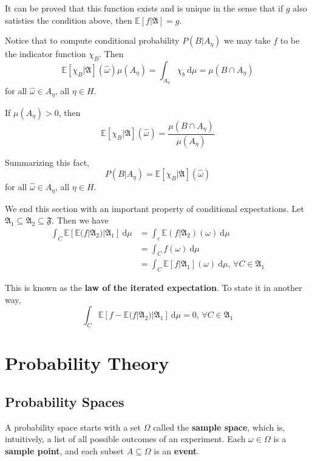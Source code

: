 \documentclass[12pt,a4paper]{article}
\theoremstyle{definition}
\begin{document}
It can be proved that this function exists and is unique in the sense that if $g$ also satisties the condition above, then $\mathbb{E}[f | \mathfrak{A}] = g$.

Notice that to compute conditional probability $P(B | A_\eta)$ we may take $f$ to be the indicator function $\chi_B$. Then
\[
	\mathbb{E}[\chi_B | \mathfrak{A}](\hat{\omega}) \mu(A_\eta) = \int_{A_\eta} \chi_b ~\mathrm{d}\mu = \mu(B \cap A_\eta)
\]
for all $\hat{\omega} \in A_\eta$, all $\eta \in H$.

If $\mu(A_\eta) > 0$, then
\[
	\mathbb{E}[\chi_B | \mathfrak{A}](\hat{\omega}) = \frac{\mu(B \cap A_\eta)}{\mu(A_\eta)}
\]

Summarizing this fact,
\[
	P(B | A_\eta) = \mathbb{E}[\chi_B | \mathfrak{A}](\hat{\omega})
\]
for all $\hat{\omega} \in A_\eta$, all $\eta \in H$.

We end this section with an important property of conditional expectations. Let $\mathfrak{A}_1 \subseteq \mathfrak{A}_2 \subseteq \mathfrak{F}$. Then we have
\begin{equation*}
	\begin{aligned}
		\int_C \mathbb{E} [\mathbb{E}(f | \mathfrak{A}_2) | \mathfrak{A}_1] ~\mathrm{d}\mu &= \int_c \mathbb{E}(f | \mathfrak{A}_2)(\omega) ~\mathrm{d}\mu \\
		&= \int_C f(\omega) ~\mathrm{d}\mu \\
		&= \int_C \mathbb{E} [f | \mathfrak{A}_1](\omega) ~\mathrm{d}\mu, \, \forall C \in \mathfrak{A}_1
	\end{aligned}
\end{equation*}

This is known as the \textbf{law of the iterated expectation}. To state it in another way,
\[
	\int_C \mathbb{E} [f - \mathbb{E}(f | \mathfrak{A}_2) | \mathfrak{A}_1] ~\mathrm{d}\mu = 0, \, \forall C \in \mathfrak{A}_1
\]

\newpage
\section{Probability Theory}

\subsection{Probability Spaces}

A probability space starts with a set $\Omega$ called the \textbf{sample space}, which is, intuitively, a list of all possible outcomes of an experiment. Each $\omega \in \Omega$ is a \textbf{sample point}, and each subset $A \subseteq \Omega$ is an \textbf{event}.
\end{document}
